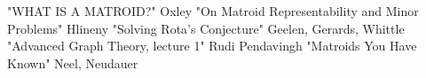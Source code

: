 
\begin{thebibliography}{10}

"WHAT IS A MATROID?" Oxley
"On Matroid Representability and Minor Problems" Hlineny
"Solving Rota’s Conjecture" Geelen, Gerards, Whittle
"Advanced Graph Theory, lecture 1" Rudi Pendavingh
"Matroids You Have Known" Neel, Neudauer

\end{thebibliography}
